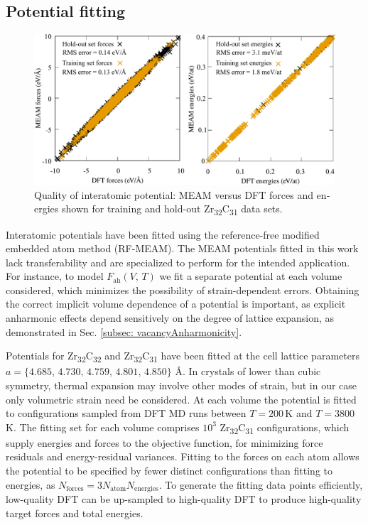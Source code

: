 \documentclass[twocolumn,american,aps,prb,showpacs,showkeys,amsmath,amssymb,superscriptaddress,a4]{revtex4-1}
\begin{document}
\subsection{Potential fitting\label{subsec:Potential-fitting}}
\begin{center}
\begin{figure}
\begin{centering}
\includegraphics[scale=0.55]{Fig1_pltMEAMfitting}
\par\end{centering}
\caption{\foreignlanguage{american}{Quality of interatomic potential: MEAM versus DFT forces and energies
shown for training and hold-out Zr\protect\textsubscript{32}C\protect\textsubscript{31}
data sets. \label{fig: pltMEAMfitting}}}
\end{figure}
\par\end{center}

Interatomic potentials have been fitted using the reference-free modified
embedded atom method (RF-MEAM).\cite{Duff2015a} 
The MEAM potentials fitted in this work lack transferability and are specialized to perform for the intended application. For instance, to model $F_{\text{ah}}(V,\,T)$ we fit a separate
potential at each volume considered, which minimizes the possibility
of strain-dependent errors. Obtaining the correct implicit
volume dependence of a potential is important, as explicit anharmonic effects depend sensitively on the degree of lattice expansion, as demonstrated in Sec. \ref{subsec: vacancyAnharmonicity}. 

Potentials for Zr\textsubscript{32}C\textsubscript{32} and Zr\textsubscript{32}C\textsubscript{31}
have been fitted at the cell lattice parameters  $a=\{4.685,\,4.730,\,4.759,\,4.801,\,4.850\}$
\AA. In crystals of lower than cubic symmetry, thermal expansion may involve other modes of strain, but in our case only volumetric strain need be considered. At each volume the potential is fitted to configurations sampled
from DFT MD runs between $T=200$\,K and $T=3800$\,K. The fitting  set for
each volume comprises $10^{3}$ Zr\textsubscript{32}C\textsubscript{31}
configurations, which supply energies and forces to the objective
function, for minimizing force residuals and energy-residual variances.
Fitting to the forces on  each atom allows the potential to be specified by fewer distinct
configurations than fitting to energies, as $N_{\text{forces}}=3N_{\text{atom}}N_{\text{energies}}$.
To generate the fitting data points efficiently, low-quality DFT can
be up-sampled to high-quality DFT to produce high-quality target
forces and total energies.
\end{document}
